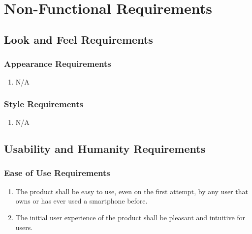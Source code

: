 \documentclass[]{article}
\begin{document}

\newpage
\section{Non-Functional Requirements}
\label{sec:non-functional_requirements}
\subsection{Look and Feel Requirements}
\label{sub:look_and_feel_requirements}

\subsubsection{Appearance Requirements}
\label{ssub:appearance_requirements}
\begin{enumerate}[{LF}1. ]
	\item N/A
\end{enumerate}

\subsubsection{Style Requirements}
\label{ssub:style_requirements}
\begin{enumerate}[{LF}1. ]
\item N/A
\end{enumerate}


\subsection{Usability and Humanity Requirements}
\label{sub:usability_and_humanity_requirements}

\subsubsection{Ease of Use Requirements}
\label{ssub:ease_of_use_requirements}
\begin{enumerate}[{UH}1. ]
	\item The product shall be easy to use, even on the first attempt, by any user that owns or has ever used a smartphone before.
	\item The initial user experience of the product shall be pleasant and intuitive for users.
\end{enumerate}
\end{document}
